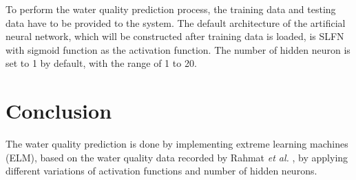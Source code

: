 \documentclass{ws-ijait}
\begin{document}
To perform the water quality prediction process, the training data and testing data have to be provided to the system. The default architecture of the artificial neural network, which will be constructed after training data is loaded, is SLFN with sigmoid function as the activation function. The number of hidden neuron is set to 1 by default, with the range of 1 to 20.

\section{Conclusion}

The water quality prediction is done by implementing extreme learning machines (ELM), based on the water quality data recorded by Rahmat {\it et al.}\cite{16} , by applying different variations of activation functions and number of hidden neurons.
\end{document}
